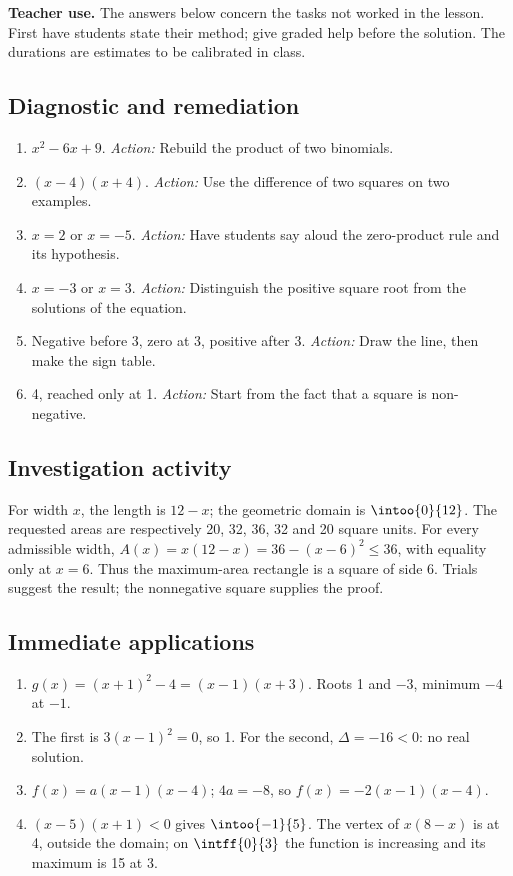 \label{C02-CORR}
\textbf{Teacher use.} The answers below concern the tasks not worked in the lesson. First have students state their method; give graded help before the solution. The durations are estimates to be calibrated in class.
\subsection*{Diagnostic and remediation}
\begin{enumerate}
\item $x^2-6x+9$. \textit{Action:} Rebuild the product of two binomials.
\item $(x-4)(x+4)$. \textit{Action:} Use the difference of two squares on two examples.
\item $x=2$ or $x=-5$. \textit{Action:} Have students say aloud the zero-product rule and its hypothesis.
\item $x=-3$ or $x=3$. \textit{Action:} Distinguish the positive square root from the solutions of the equation.
\item Negative before 3, zero at 3, positive after 3. \textit{Action:} Draw the line, then make the sign table.
\item 4, reached only at 1. \textit{Action:} Start from the fact that a square is non-negative.
\end{enumerate}
\subsection*{Investigation activity}
For width $x$, the length is $12-x$; the geometric domain is $\intoo{0}{12}$. The requested areas are respectively 20, 32, 36, 32 and 20 square units. For every admissible width, $A(x)=x(12-x)=36-(x-6)^2\leq36$, with equality only at $x=6$. Thus the maximum-area rectangle is a square of side 6. Trials suggest the result; the nonnegative square supplies the proof.
\subsection*{Immediate applications}
\begin{enumerate}
\item $g(x)=(x+1)^2-4=(x-1)(x+3)$. Roots 1 and $-3$, minimum $-4$ at $-1$.
\item The first is $3(x-1)^2=0$, so 1. For the second, $\Delta=-16<0$: no real solution.
\item $f(x)=a(x-1)(x-4)$; $4a=-8$, so $f(x)=-2(x-1)(x-4)$.
\item $(x-5)(x+1)<0$ gives $\intoo{-1}{5}$. The vertex of $x(8-x)$ is at 4, outside the domain; on $\intff{0}{3}$ the function is increasing and its maximum is 15 at 3.
\end{enumerate}
